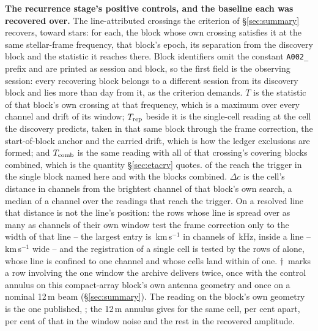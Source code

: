 \begin{table}
\centering
\caption{\textbf{The recurrence stage's positive controls, and the baseline
each was recovered over.} The \QcNCtl{} line-attributed crossings the
criterion of \S\ref{sec:summary} recovers, toward \QcNStar{} stars: for each,
the block whose own crossing satisfies it at the same stellar-frame
frequency, that block's epoch, its separation from the discovery block and
the statistic it reaches there. Block identifiers omit the constant
\texttt{A002\_} prefix and are printed as session and block, so the first
field is the observing session: every recovering block belongs to a different
session from its discovery block and lies more than \EpSep{} day from it, as
the criterion demands. $T$ is the statistic of that
block's own crossing at that frequency, which is a maximum over every channel
and drift of its window; $T_{\rm rep}$ beside it is the single-cell reading at
the cell the discovery predicts, taken in that same block through the frame
correction, the start-of-block anchor and the carried drift, which is how the
\RcNExcl{} ledger exclusions are formed; and $T_{\rm comb}$ is the
same reading with all of that crossing's covering blocks combined, which is
the quantity \S\ref{sec:etacrv} quotes. \RgNCtlSingle{} of the \RgNCtl{}
reach the trigger in the single block named here and \RgNCtlComb{} with the
blocks combined. $\Delta c$ is the cell's distance in channels from the
brightest channel of that block's own search, a median \RgCtlDchAbsMed{} of a
channel over the readings that reach the trigger. On a resolved line that
distance is not the line's position: the \RgRegNRes{} rows whose line is
spread over as many as \RgResFwhmChMax{} channels of their own window test the
frame correction only to the width of that line -- the largest entry is
\RgOffMaxKms\,km\,s$^{-1}$ in channels of \RgOffMaxChanKHz\,kHz, inside a line
\RgFwhmLoKms{}--\RgFwhmHiKms\,km\,s$^{-1}$ wide -- and the registration of a
single cell is tested by the \RgRegNUnres{} rows of \RgRegStar{} alone, whose
line is confined to one channel and whose cells land within \RgRegMaxCh{} of
one.
$\dagger$~marks a row involving the one window the archive delivers twice,
once with the control annulus on this compact-array block's own antenna
geometry and once on a nominal 12\,m beam (\S\ref{sec:summary}). The reading
on the block's own geometry is the one published, \LrSuppPub; the 12\,m
annulus gives \LrSuppOwn{} for the same cell, \LrSuppPct{} per cent apart,
\NbProvRmsPct{} per cent of that in the window noise and the rest in the
recovered amplitude.
}
\end{table}
